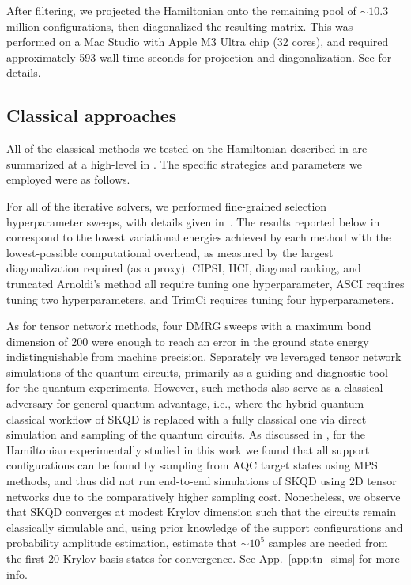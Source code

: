 \documentclass[
  reprint,            %
  amsmath,amssymb,
  aps,
  superscriptaddress, %
  longbibliography
]{revtex4-2}
\theoremstyle{definition}
\begin{document}
After filtering, we projected the Hamiltonian onto the remaining pool of $\sim10.3$ million configurations, then diagonalized the resulting matrix.
This was performed on a Mac Studio with Apple M3 Ultra chip (32 cores), and required approximately 593 wall-time seconds for projection and diagonalization.
See  for details.


\subsection{Classical approaches}
\label{sec:classical_attacks}

All of the classical methods we tested on the Hamiltonian described in  are summarized at a high-level in .
The specific strategies and parameters we employed were as follows.

For all of the iterative solvers, we performed fine-grained selection hyperparameter sweeps, with details given in~. The results reported below in  correspond to the lowest variational energies achieved by each method with the lowest-possible computational overhead, as measured by the largest diagonalization required (as a proxy). CIPSI, HCI, diagonal ranking, and truncated Arnoldi's method all require tuning one hyperparameter, ASCI requires tuning two hyperparameters, and TrimCi requires tuning four hyperparameters.

As for tensor network methods, four DMRG sweeps with a maximum bond dimension of 200 were enough to reach an error in the ground state energy indistinguishable from machine precision.
Separately we leveraged tensor network simulations of the quantum circuits, primarily as a guiding and diagnostic tool for the quantum experiments. However, such methods also serve as a classical adversary for general quantum advantage, i.e., where the hybrid quantum-classical workflow of SKQD is replaced with a fully classical one via direct simulation and sampling of the quantum circuits. As discussed in , for the Hamiltonian experimentally studied in this work we found that all support configurations can be found by sampling from AQC target states using MPS methods, and thus did not run end-to-end simulations of SKQD using 2D tensor networks due to the comparatively higher sampling cost. Nonetheless, we observe that SKQD converges at modest Krylov dimension such that the circuits remain classically simulable and, using prior knowledge of the support configurations and probability amplitude estimation, estimate that $\sim10^5$ samples are needed from the first 20 Krylov basis states for convergence. See App.~\ref{app:tn_sims} for more info. 
\end{document}
